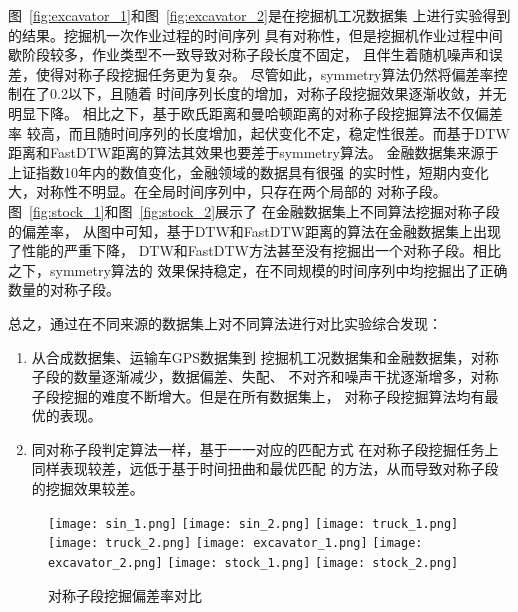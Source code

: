 图~\ref{fig:excavator_1}和图~\ref{fig:excavator_2}是在挖掘机工况数据集
上进行实验得到的结果。挖掘机一次作业过程的时间序列
具有对称性，但是挖掘机作业过程中间歇阶段较多，作业类型不一致导致对称子段长度不固定，
且伴生着随机噪声和误差，使得对称子段挖掘任务更为复杂。
尽管如此，symmetry算法仍然将偏差率控制在了0.2以下，且随着
时间序列长度的增加，对称子段挖掘效果逐渐收敛，并无明显下降。
相比之下，基于欧氏距离和曼哈顿距离的对称子段挖掘算法不仅偏差率
较高，而且随时间序列的长度增加，起伏变化不定，稳定性很差。而基于DTW
距离和FastDTW距离的算法其效果也要差于symmetry算法。
金融数据集来源于上证指数10年内的数值变化，金融领域的数据具有很强
的实时性，短期内变化大，对称性不明显。在全局时间序列中，只存在两个局部的
对称子段。图~\ref{fig:stock_1}和图~\ref{fig:stock_2}展示了
在金融数据集上不同算法挖掘对称子段的偏差率，
从图中可知，基于DTW和FastDTW距离的算法在金融数据集上出现了性能的严重下降，
DTW和FastDTW方法甚至没有挖掘出一个对称子段。相比之下，symmetry算法的
效果保持稳定，在不同规模的时间序列中均挖掘出了正确数量的对称子段。

总之，通过在不同来源的数据集上对不同算法进行对比实验综合发现：
\begin{enumerate}
  \item 从合成数据集、运输车GPS数据集到
        挖掘机工况数据集和金融数据集，对称子段的数量逐渐减少，数据偏差、失配、
        不对齐和噪声干扰逐渐增多，对称子段挖掘的难度不断增大。但是在所有数据集上，
        对称子段挖掘算法均有最优的表现。
  \item 同对称子段判定算法一样，基于一一对应的匹配方式
        在对称子段挖掘任务上同样表现较差，远低于基于时间扭曲和最优匹配
        的方法，从而导致对称子段的挖掘效果较差。
\end{enumerate}


\begin{figure}
  \centering
  {\texttt{[image: sin\_1.png]}}
  {\texttt{[image: sin\_2.png]}}
  {\texttt{[image: truck\_1.png]}}
  {\texttt{[image: truck\_2.png]}}
  {\texttt{[image: excavator\_1.png]}}
  {\texttt{[image: excavator\_2.png]}}
  {\texttt{[image: stock\_1.png]}}
  {\texttt{[image: stock\_2.png]}}
  \caption{对称子段挖掘偏差率对比}
  \label{fig:segement_symmetry}
\end{figure}

